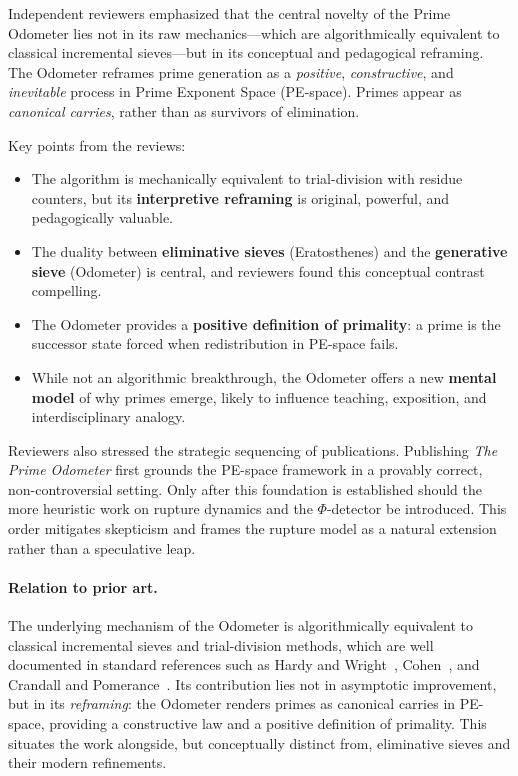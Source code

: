 \documentclass[12pt]{article}
\theoremstyle{definition}
\theoremstyle{remark}
\begin{document}
Independent reviewers emphasized that the central novelty of the Prime Odometer lies not in its raw mechanics—which are algorithmically equivalent to classical incremental sieves—but in its conceptual and pedagogical reframing. The Odometer reframes prime generation as a \emph{positive}, \emph{constructive}, and \emph{inevitable} process in Prime Exponent Space (PE-space). Primes appear as \emph{canonical carries}, rather than as survivors of elimination.

Key points from the reviews:

\begin{itemize}
  \item The algorithm is mechanically equivalent to trial-division with residue counters, but its \textbf{interpretive reframing} is original, powerful, and pedagogically valuable.
  \item The duality between \textbf{eliminative sieves} (Eratosthenes) and the \textbf{generative sieve} (Odometer) is central, and reviewers found this conceptual contrast compelling.
  \item The Odometer provides a \textbf{positive definition of primality}: a prime is the successor state forced when redistribution in PE-space fails.
  \item While not an algorithmic breakthrough, the Odometer offers a new \textbf{mental model} of why primes emerge, likely to influence teaching, exposition, and interdisciplinary analogy.
\end{itemize}

Reviewers also stressed the strategic sequencing of publications. Publishing \emph{The Prime Odometer} first grounds the PE-space framework in a provably correct, non-controversial setting. Only after this foundation is established should the more heuristic work on rupture dynamics and the $\Phi$-detector be introduced. This order mitigates skepticism and frames the rupture model as a natural extension rather than a speculative leap.

\paragraph{Relation to prior art.}
The underlying mechanism of the Odometer is algorithmically equivalent to classical incremental sieves and trial-division methods, which are well documented in standard references such as Hardy and Wright~\cite{hardywright}, Cohen~\cite{cohen}, and Crandall and Pomerance~\cite{crandallpomerance}. Its contribution lies not in asymptotic improvement, but in its \emph{reframing}: the Odometer renders primes as canonical carries in PE-space, providing a constructive law and a positive definition of primality. This situates the work alongside, but conceptually distinct from, eliminative sieves and their modern refinements.
\end{document}
